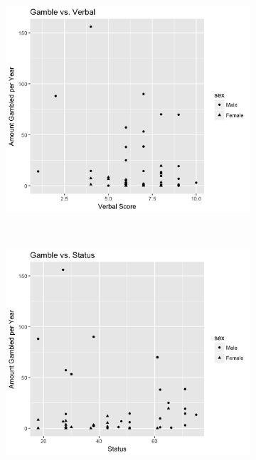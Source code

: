 \documentclass{exam}
\begin{document}
\pagebreak
\begin{figure}[t!]
	\begin{subfigure}
		\centering
		\includegraphics[scale=0.7]{Gamble_V_verbal}
	\end{subfigure}
	~
	\begin{subfigure}
		\centering
		\includegraphics[scale=0.7]{Gamble_V_Status}
	\end{subfigure}
	
\end{figure}
\end{document}
